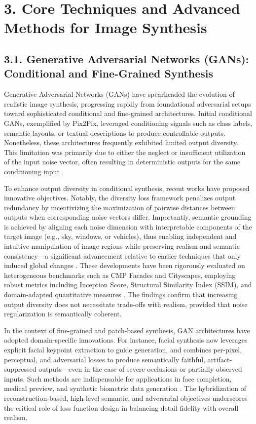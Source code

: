 \documentclass[11pt]{article}
\begin{document}
\section{3. Core Techniques and Advanced Methods for Image Synthesis}

\subsection{3.1. Generative Adversarial Networks (GANs): Conditional and Fine-Grained Synthesis}

Generative Adversarial Networks (GANs) have spearheaded the evolution of realistic image synthesis, progressing rapidly from foundational adversarial setups toward sophisticated conditional and fine-grained architectures. Initial conditional GANs, exemplified by Pix2Pix, leveraged conditioning signals such as class labels, semantic layouts, or textual descriptions to produce controllable outputs. Nonetheless, these architectures frequently exhibited limited output diversity. This limitation was primarily due to either the neglect or insufficient utilization of the input noise vector, often resulting in deterministic outputs for the same conditioning input \cite{ref93, ref95}.

To enhance output diversity in conditional synthesis, recent works have proposed innovative objectives. Notably, the diversity loss framework penalizes output redundancy by incentivizing the maximization of pairwise distances between outputs when corresponding noise vectors differ. Importantly, semantic grounding is achieved by aligning each noise dimension with interpretable components of the target image (e.g., sky, windows, or vehicles), thus enabling independent and intuitive manipulation of image regions while preserving realism and semantic consistency—a significant advancement relative to earlier techniques that only induced global changes \cite{ref93}. These developments have been rigorously evaluated on heterogeneous benchmarks such as CMP Facades and Cityscapes, employing robust metrics including Inception Score, Structural Similarity Index (SSIM), and domain-adapted quantitative measures \cite{ref93, ref95}. The findings confirm that increasing output diversity does not necessitate trade-offs with realism, provided that noise regularization is semantically coherent.

In the context of fine-grained and patch-based synthesis, GAN architectures have adopted domain-specific innovations. For instance, facial synthesis now leverages explicit facial keypoint extraction to guide generation, and combines per-pixel, perceptual, and adversarial losses to produce semantically faithful, artifact-suppressed outputs—even in the case of severe occlusions or partially observed inputs. Such methods are indispensable for applications in face completion, medical preview, and synthetic biometric data generation \cite{ref97}. The hybridization of reconstruction-based, high-level semantic, and adversarial objectives underscores the critical role of loss function design in balancing detail fidelity with overall realism.
\end{document}
